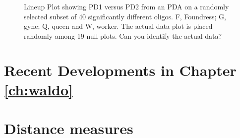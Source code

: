 \documentclass[12]{report}
\begin{document}
\begin{figure}[hbtp]
   \centering
       \caption{Lineup Plot showing PD1 versus PD2 from an PDA on a randomly selected subset of 40 significantly different oligos. F, Foundress; G, gyne; Q, queen and W, worker. The actual data plot is placed randomly among 19 null plots. Can you identify the actual data?  }
       \label{toth_pda}
\end{figure}   


\section{Recent Developments in Chapter \ref{ch:waldo}}

\section{Distance measures}
\end{document}
